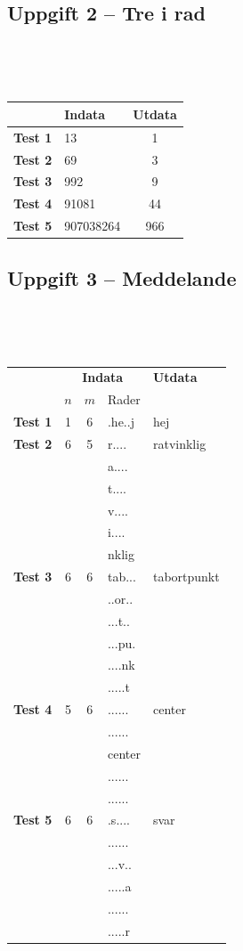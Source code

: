 \documentclass[a4paper,12pt,oneside]{amsbook}
\theoremstyle{test}
\newcommand{\fe}[1]{\textbf{#1}}            %
\begin{document}
\subsection*{Uppgift 2 -- Tre i rad}
~\\
{\tt 
\begin{tabular}{||l||l||c||}\hline\hline
& {\fe{Indata}} & \fe{Utdata} \\ \hline \hline
\fe{Test 1} & 13 & 1\\ \hline
\fe{Test 2} & 69 & 3 \\ \hline
\fe{Test 3} & 992 & 9 \\ \hline
\fe{Test 4} & 91081 & 44\\ \hline
\fe{Test 5} & 907038264 & 966\\ \hline\hline
\end{tabular}
}

\subsection*{Uppgift 3 -- Meddelande}
~\\
{\tt 
\begin{tabular}{||l||c|c|l||l||}\hline\hline
& \multicolumn{3}{c||}{\fe{Indata}} & \fe{Utdata} \\
& $n$ & $m$ & Rader & \\ \hline \hline
\fe{Test 1} & 1 & 6 &	.he..j &	hej	\\ \hline
\fe{Test 2} & 6 & 5 & r....	&	ratvinklig	\\
&&&	a....	&	\\
&&&	t....	&	\\ 
&&&	v....	&	\\ 
&&&	i....	&	\\ 
&&&	nklig	&	\\ \hline
\fe{Test 3} & 6 & 6 & tab...	&	tabortpunkt	\\
&&&	..or..	&	\\
&&&	...t..	&	\\
&&&	...pu.	&	\\
&&&	....nk	&	\\
&&&	.....t	&	\\ \hline
\fe{Test 4} & 5 & 6 &	......	&	center	\\
&&&	......	&	\\ 
&&&	center	&	\\
&&&	......	&	\\ 
&&&	......	&	\\ \hline
\fe{Test 5} & 6 & 6 &	.s....	&	svar	\\
&&&	......	& \\
&&&	...v..	& \\
&&&	.....a	& \\
&&&	......	& \\
&&&	.....r	& \\\hline \hline
\end{tabular}
}
\end{document}
